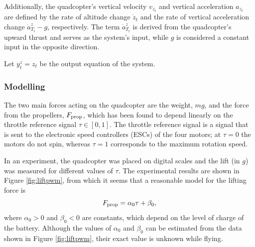 \documentclass{report}
\begin{document}
Additionally, the quadcopter's vertical velocity \( v_{z_t} \) and vertical
acceleration \( a_{z_t} \) are defined by the rate of altitude change \(
\dot{z}_t \) and the rate of vertical acceleration change \( \dot{a}^z_{T_t} - g
\), respectively. The term \( \dot{a}^z_{T_t} \) is derived from the
quadcopter's upward thrust and serves as the system's input, while \( g \) is
considered a constant input in the opposite direction.

Let \( y_{t}^z = z_t \) be the output equation of the system. 

\subsubsection*{Modelling}
  The two main forces acting on the quadcopter are the weight, $mg$, and the
  force from the propellers, $F_{\rm prop}$, which has been found to depend
  linearly on the throttle reference signal $\tau\in[0,1]$. The throttle
  reference signal is a signal that is sent to the electronic speed controllers
  (ESCs) of the four motors; at $\tau=0$ the motors do not spin, whereas
  $\tau=1$ corresponds to the maximum rotation speed.
  
  In an experiment, the quadcopter was placed on digital scales and the lift (in
  $\unit{g}$) was measured for different values of $\tau$. The experimental
  results are shown in Figure \ref{fig:liftpwm}, from which it seems that a
  reasonable model for the lifting force is
  \begin{equation}
    F_{\rm prop} = \alpha_0 \tau + \beta_0,
    \label{eq:Fprop}
  \end{equation}
  where $\alpha_0>0$ and $\beta_0<0$ are constants, which depend on the level of
  charge of the battery. Although the values of $\alpha_0$ and $\beta_0$ can be
  estimated from the data shown in Figure \ref{fig:liftpwm}, their exact value
  is unknown while flying.
  
\end{document}
